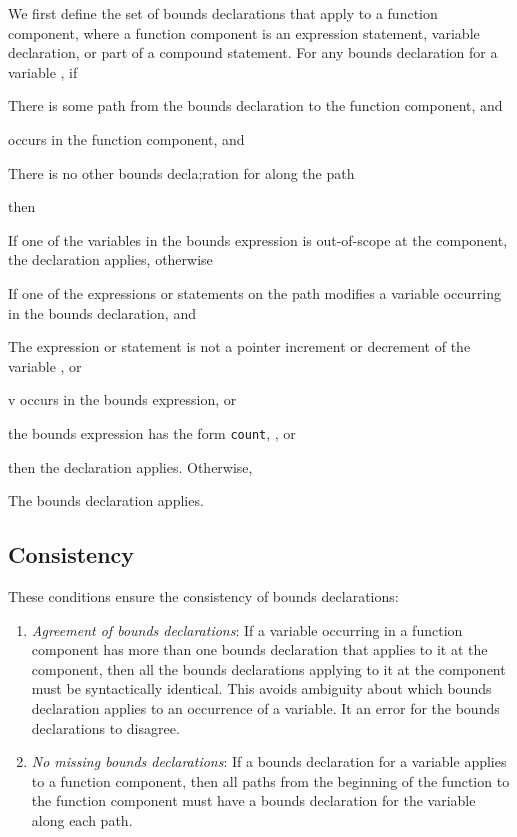 We first define the set of bounds declarations that apply to a function
component, where a function component is an expression statement,
variable declaration, or part of a compound statement. For any bounds
declaration for a variable , if

\begin{compactenum}
\item
  There is some path from the bounds declaration to the function
  component, and
\item
   occurs in the function component, and
\item
  There is no other bounds decla;ration for  along the path
\end{compactenum}

then

\begin{compactenum}
\item
  If one of the variables in the bounds expression is out-of-scope at
  the component, the declaration 
  applies, otherwise
\item
  If one of the expressions or statements on the path modifies a
  variable occurring in the bounds declaration, and

  \begin{compactenum}
  \item
    The expression or statement is not a pointer increment or decrement
    of the variable , or
  \item
    v occurs in the bounds expression, or
  \item
    the bounds expression has the form \texttt{count},
    \boundsnone, or \boundsany
  \end{compactenum}
then the declaration  applies.
Otherwise,
\item
  The bounds declaration applies.
\end{compactenum}

 \subsection{Consistency}

These conditions ensure the consistency of bounds declarations:

\begin{enumerate}
\item
  \emph{Agreement of bounds declarations}: If a variable occurring in a
  function component has more than one bounds declaration that applies
  to it at the component, then all the bounds declarations applying to
  it at the component must be syntactically identical. This avoids
  ambiguity about which bounds declaration applies to an occurrence of a
  variable. It an error for the bounds declarations to disagree.
\item
  \emph{No missing bounds declarations}: If a bounds declaration for a
  variable applies to a function component, then all paths from the
  beginning of the function to the function component must have a bounds
  declaration for the variable along each path.
\end{enumerate}

